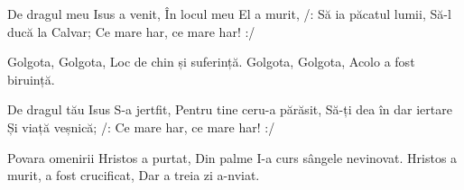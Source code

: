 
\beginverse
De dragul meu Isus a venit,
În locul meu El a murit,
/: Să ia păcatul lumii,
Să-l ducă la Calvar;
Ce mare har, ce mare har! :/
\endverse

\beginchorus
Golgota, Golgota,
Loc de chin și suferință.
Golgota, Golgota,
Acolo a fost biruință.
\endchorus

\beginverse
De dragul tău Isus S-a jertfit,
Pentru tine ceru-a părăsit,
Să-ți dea în dar iertare
Și viață veșnică;
/: Ce mare har, ce mare har! :/
\endverse

\beginchorus
Povara omenirii Hristos a purtat,
Din palme I-a curs sângele nevinovat.
Hristos a murit, a fost crucificat,
Dar a treia zi a-nviat.
\endchorus

\endsong